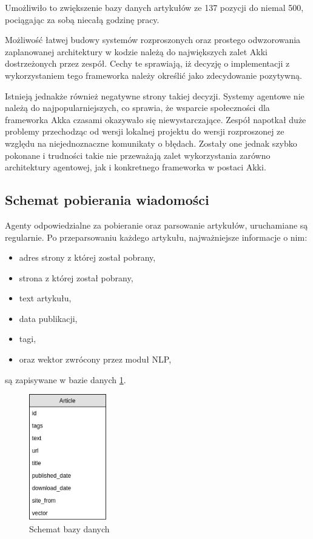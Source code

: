 Umożliwiło to zwiększenie bazy danych artykułów ze 137 pozycji do niemal 500, pociągając za sobą niecałą godzinę pracy.
\par Możliwość łatwej budowy systemów rozproszonych oraz prostego odwzorowania zaplanowanej architektury w kodzie należą do największych zalet Akki dostrzeżonych przez zespół. Cechy te sprawiają, iż decyzję o implementacji z wykorzystaniem tego frameworka należy określić jako zdecydowanie pozytywną.
\par Istnieją jednakże również negatywne strony takiej decyzji. Systemy agentowe nie należą do najpopularniejszych, co sprawia, że wsparcie społeczności dla frameworka Akka czasami okazywało się niewystarczające. Zespół napotkał duże problemy przechodząc od wersji lokalnej projektu do wersji rozproszonej ze względu na niejednoznaczne komunikaty o błędach. Zostały one jednak szybko pokonane i trudności takie nie przeważają zalet wykorzystania zarówno architektury agentowej, jak i konkretnego frameworka w postaci Akki.

\subsection{Schemat pobierania wiadomości}

Agenty odpowiedzialne za pobieranie oraz parsowanie artykułów, uruchamiane są
regularnie. Po przeparsowaniu każdego artykułu, najważniejsze informacje o nim:

\begin{itemize}
\item adres strony z której został pobrany,
\item strona z której został pobrany,
\item text artykułu,
\item data publikacji,
\item tagi,
\item oraz wektor zwrócony przez moduł NLP,
\end{itemize}
są zapisywane w bazie danych \ref{fig:db}.

\begin{figure}[ht!]
\centering
\includegraphics[height=0.3\textheight, width=0.3\textwidth]{./pict/db.png}
\caption{Schemat bazy danych}
\label{fig:db}
\end{figure}